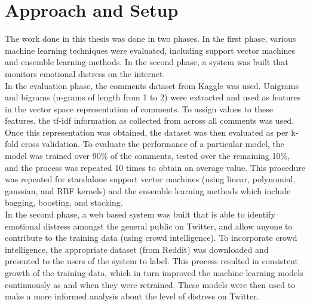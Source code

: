 \section{Approach and Setup}
The work done in this thesis was done in two phases. In the first phase, various machine learning techniques were evaluated, including support vector machines and ensemble learning methods. In the second phase, a system was built that monitors emotional distress on the internet.\\

In the evaluation phase, the comments dataset from Kaggle was used. Unigrams and bigrams (n-grams of length from 1 to 2) were extracted and used as features in the vector space representation of comments. To assign values to these features, the tf-idf information as collected from across all comments was used. Once this representation was obtained, the dataset was then evaluated as per k-fold cross validation. To evaluate the performance of a particular model, the model was trained over 90\% of the comments, tested over the remaining 10\%, and the process was repeated 10 times to obtain an average value. This procedure was repeated for standalone support vector machines (using linear, polynomial, gaussian, and RBF kernels) and the ensemble learning methods which include bagging, boosting, and stacking.\\

In the second phase, a web based system was built that is able to identify emotional distress amongst the general public on Twitter, and allow anyone to contribute to the training data (using crowd intelligence). To incorporate crowd intelligence, the appropriate dataset (from Reddit) was downloaded and presented to the users of the system to label. This process resulted in consistent growth of the training data, which in turn improved the machine learning models continuously as and when they were retrained. These models were then used to make a more informed analysis about the level of distress on Twitter.

